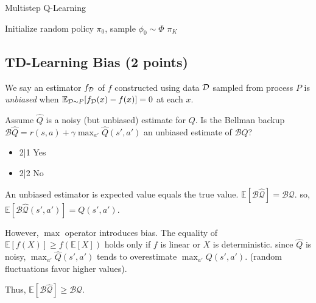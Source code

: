 \documentclass{article}
\newif\ifsolutions
\begin{document}
\begin{algorithm}[H]
  \caption{Multistep Q-Learning}
  \label{alg:multi}
  Initialize random policy $\pi_0$, sample $\phi_0 \sim \Phi$\;
  \Return $\pi_K$\;
\end{algorithm}


\def\makecols#1#2{{\def\p{#2}\newcount\i\i0\hfill\loop\advance\i1\makebox[1cm][c]{\expandafter\p\the\i}\kern.5cm\ifnum\i<#1\repeat\kern-1cm}}
\def\heading#1{\bf\expandafter\uppercase\expandafter{\romannumeral#1.}}
\def\boxes#1{\ensuremath\square}
\def\filled#1#2|#3{\ifnum#1=#3\ensuremath\blacksquare
	\else\if\relax#2\relax\ensuremath\square
	\else\filled#2|#3\fi\fi}
\def\ncol{3}
\newcommand{\checkeditem}[2]{\edef\x{0#1}\item[\expandafter\filled\x|#2]}


\def\choices#1#2{
	\begin{enumerate}
	\item on-policy in tabular setting \makecols\ncol{\filled0#1|}
	\item off-policy in tabular setting \makecols\ncol{\filled0#2|}
	\end{enumerate}
}

\subsection{TD-Learning Bias (2 points)}
\label{q:td_bias}

\def\answer{2} %
\ifsolutions\solve\thesubsection\fi
We say an estimator $f_{\mathcal{D}}$ of $f$ constructed using data $\mathcal{D}$ sampled from process $P$ is \textit{unbiased} when $\mathbb{E}_{\mathcal{D}\sim P}[f_{\mathcal{D}}(x)-f(x)]=0$ at each $x$.

Assume $\hat Q$ is a noisy (but unbiased) estimate for $Q$. Is the Bellman backup $\mathcal{B}\hat Q = r(s, a) + \gamma \max_{a'} \hat Q(s', a')$ an unbiased estimate of $\mathcal{B}Q$?
\begin{itemize}
    \checkeditem\answer1 Yes
    \checkeditem\answer2 No
\end{itemize}

\begin{tcolorbox}[answerbox, parbox=false]
  An unbiased estimator is expected value equals the true value. $\mathbb{E}[\mathcal{B}\hat{\mathcal{Q}}] = \mathcal{BQ}$. so, $\mathbb{E}[\mathcal{B}\mathcal{\hat{Q}}(s',a')] = Q(s',a')$.


  However, $\max$ operator introduces bias. The equality of $\mathbb{E}[f(X)] \geq f(\mathbb{E}[X])$ holds only if $f$ is linear or $X$ is deterministic. since $\hat{Q}$ is noisy, $\max_{a'}\hat{Q}(s',a')$ tends to overestimate $\max_{a'}Q(s',a')$. (random fluctuations favor higher values).


  Thus, $\mathbb{E}[\mathcal{B}\hat{\mathcal{Q}}] \geq \mathcal{BQ}$.
\end{tcolorbox}
\end{document}

